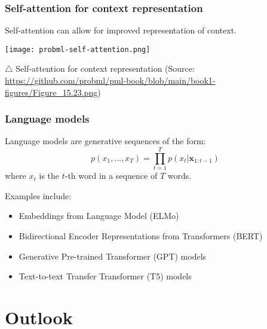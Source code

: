 \documentclass[smaller]{beamer}
\begin{document}
\begin{frame}
  \frametitle{Self-attention for context representation}\pe

  Self-attention can allow for improved representation of context.

  \begin{center}
    \texttt{[image: probml-self-attention.png]}

    {\footnotesize $\triangle$ Self-attention for context representation (Source: \url{https://github.com/probml/pml-book/blob/main/book1-figures/Figure_15.23.png})}
  \end{center}

\end{frame}
 \begin{frame}
  \frametitle{Language models}\pe

  Language models are generative sequences of the form:\pe
  \begin{equation}
    p(x_1, \ldots, x_T) = \prod_{t=1}^{T}p(x_t|\bm x_{1:t-1})
  \end{equation}
  \pe
  where $x_t$ is the $t$-th word in a sequence of $T$ words.\pe

  Examples include:
 \begin{itemize}
  \item Embeddings from Language Model (ELMo)\pe
  \item Bidirectional Encoder Representations from Transformers (BERT)\pe
  \item Generative Pre-trained Transformer (GPT) models\pe
  \item Text-to-text Transfer Transformer (T5) models
 \end{itemize}
  
 
 \end{frame}
\section{Outlook}
\end{document}
